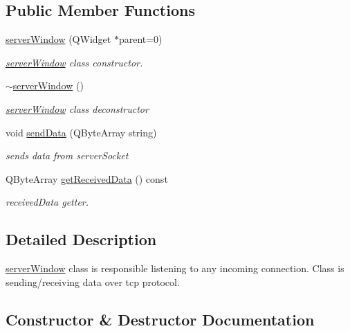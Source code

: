 \subsection*{Public Member Functions}
\begin{DoxyCompactItemize}
\item 
\mbox{\hyperlink{classserver_window_a73c38568b8be85b06a301947250c8b58}{server\+Window}} (Q\+Widget $\ast$parent=0)
\begin{DoxyCompactList}\small\item\em \mbox{\hyperlink{classserver_window}{server\+Window}} class constructor. \end{DoxyCompactList}\item 
\mbox{\hyperlink{classserver_window_a8690c73305f40b9b8bc4ee0f42833d4a}{$\sim$server\+Window}} ()
\begin{DoxyCompactList}\small\item\em \mbox{\hyperlink{classserver_window}{server\+Window}} class deconstructor \end{DoxyCompactList}\item 
void \mbox{\hyperlink{classserver_window_a802818e2dd4970c8240efa96bce4c909}{send\+Data}} (Q\+Byte\+Array string)
\begin{DoxyCompactList}\small\item\em sends data from server\+Socket \end{DoxyCompactList}\item 
\mbox{\label{classserver_window_af6f4838dce7cf78130b7aa81b3915595}} 
Q\+Byte\+Array \mbox{\hyperlink{classserver_window_af6f4838dce7cf78130b7aa81b3915595}{get\+Received\+Data}} () const
\begin{DoxyCompactList}\small\item\em received\+Data getter. \end{DoxyCompactList}\end{DoxyCompactItemize}


\subsection{Detailed Description}
\mbox{\hyperlink{classserver_window}{server\+Window}} class is responsible listening to any incoming connection. Class is sending/receiving data over tcp protocol. 

\subsection{Constructor \& Destructor Documentation}
\mbox{\label{classserver_window_a73c38568b8be85b06a301947250c8b58}} 
